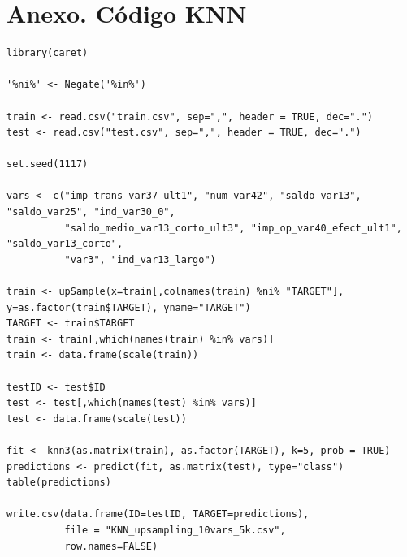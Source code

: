 \documentclass[11pt,a4paper,spanish]{article} %
\begin{document}
\section{Anexo. Código KNN}
{\scriptsize
\begin{verbatim}
library(caret)

'%ni%' <- Negate('%in%') 

train <- read.csv("train.csv", sep=",", header = TRUE, dec=".")
test <- read.csv("test.csv", sep=",", header = TRUE, dec=".")

set.seed(1117)

vars <- c("imp_trans_var37_ult1", "num_var42", "saldo_var13", "saldo_var25", "ind_var30_0", 
          "saldo_medio_var13_corto_ult3", "imp_op_var40_efect_ult1", "saldo_var13_corto", 
          "var3", "ind_var13_largo")

train <- upSample(x=train[,colnames(train) %ni% "TARGET"], y=as.factor(train$TARGET), yname="TARGET")
TARGET <- train$TARGET
train <- train[,which(names(train) %in% vars)]
train <- data.frame(scale(train))

testID <- test$ID
test <- test[,which(names(test) %in% vars)]
test <- data.frame(scale(test))

fit <- knn3(as.matrix(train), as.factor(TARGET), k=5, prob = TRUE)  
predictions <- predict(fit, as.matrix(test), type="class")
table(predictions)

write.csv(data.frame(ID=testID, TARGET=predictions), 
          file = "KNN_upsampling_10vars_5k.csv",
          row.names=FALSE)
\end{verbatim}
}

\newpage
\end{document}
